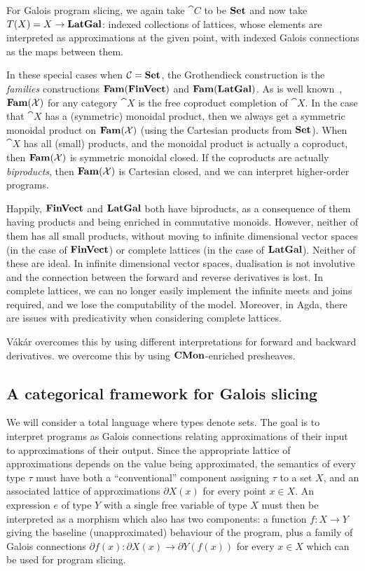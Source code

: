 For Galois program slicing, we again take $\cat{C}$ to be $\mathbf{Set}$ and now take $T(X) = X \to \mathbf{LatGal}$: indexed collections of lattices, whose elements are interpreted as approximations at the given point, with indexed Galois connections as the maps between them.

In these special cases when $\mathcal{C} = \mathbf{Set}$, the Grothendieck construction is the {\em families} constructions $\mathbf{Fam}(\mathbf{FinVect})$ and $\mathbf{Fam}(\mathbf{LatGal})$. As is well known~\cite{lawvere63}, $\mathbf{Fam}(\mathcal{X})$ for any category $\cat{X}$ is the free coproduct completion of $\cat{X}$. In the case that $\cat{X}$ has a (symmetric) monoidal product, then we always get a symmetric monoidal product on $\mathbf{Fam}(\mathcal{X})$ (using the Cartesian products from $\mathbf{Set}$). When $\cat{X}$ has all (small) products, and the monoidal product is actually a coproduct, then $\mathbf{Fam}(\mathcal{X})$ is symmetric monoidal closed. If the coproducts are actually {\em biproducts}, then $\mathbf{Fam}(\mathcal{X})$ is Cartesian closed, and we can interpret higher-order programs.


Happily, $\mathbf{FinVect}$ and $\mathbf{LatGal}$ both have biproducts, as a consequence of them having products and being enriched in commutative monoids. However, neither of them has all small products, without moving to infinite dimensional vector spaces (in the case of $\mathbf{FinVect}$) or complete lattices (in the case of $\mathbf{LatGal}$). Neither of these are ideal. In infinite dimensional vector spaces, dualisation is not involutive and the connection between the forward and reverse derivatives is lost. In complete lattices, we can no longer easily implement the infinite meets and joins required, and we lose the computability of the model. Moreover, in Agda, there are issues with predicativity when considering complete lattices.

Vákár overcomes this by using different interpretations for forward and backward derivatives. we overcome this by using $\mathbf{CMon}$-enriched presheaves.

\subsection{A categorical framework for Galois slicing}

We will consider a total language where types denote sets. The goal is to interpret programs as Galois
connections relating approximations of their input to approximations of their output. Since the appropriate
lattice of approximations depends on the value being approximated, the semantics of every type $\tau$ must
have both a ``conventional'' component assigning $\tau$ to a set $X$, and an associated lattice of
approximations $\partial X(x)$ for every point $x \in X$. An expression $e$ of type $Y$ with a single free
variable of type $X$ must then be interpreted as a morphism which also has two components: a function $f: X
\to Y$ giving the baseline (unapproximated) behaviour of the program, plus a family of Galois connections
$\partial f(x): \partial X(x) \to \partial Y(f(x))$ for every $x \in X$ which can be used for program slicing.

